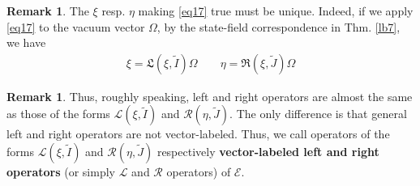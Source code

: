 \documentclass[11pt,b5paper,notitlepage]{article}
\theoremstyle{definition}
\newtheorem{rem}[df]{Remark}
\theoremstyle{plain}
\newtheorem{pp}[df]{Proposition}
\newcommand{\fk}{\mathfrak}
\newcommand{\mc}{\mathcal}
\newcommand{\wtd}{\widetilde}
\newcommand{\scr}{\mathscr}
\newcommand{\xk}{\mathfrak x}
\newcommand{\yk}{\mathfrak y}
\newcommand{\pr}{\mathrm {pr}}
\numberwithin{equation}{section}
\begin{document}
\begin{comment}
\begin{pp}\label{lb11}
In Def. \ref{lb2}, let $\xi=\fk L(\xk,\wtd I)\Omega$ and $\eta=\fk R(\yk,\wtd J)\Omega$. Then $\xi\in\mc H_i^\pr(I)$ and $\eta\in\mc H_j^\pr(J)$, and we have
\begin{align}\label{eq7}
\fk L(\xk,\wtd I)=\scr L(\xi,\wtd I)\qquad \fk R(\yk,\wtd I)=\scr R(\eta,\wtd J)
\end{align}
when acting any object of $\scr C$.
\end{pp}



\begin{proof}
By assumption, $\fk L(\xk,\wtd I)|_{\mc H_0}$ is closed and has core $\mc H_k(\wtd I')$, and for each $y\in\mc A(I')$ we have by \eqref{eq3} that
\begin{align*}
y\xi=R(y\Omega,\wtd I')\fk L(\xk,\wtd I)\Omega=\fk L(\xk,\wtd I)y\Omega
\end{align*}
This proves $\xi\in\mc H_i^\pr(I)$. By \eqref{eq4} and \eqref{eq5}, we see that $\fk L(\xk,\wtd I)|_{\mc H_k}$ equals $\scr L(\xi,\wtd I)|_{\mc H_k}$ when acting on their common core $\mc H_k(I')$. This proves the first half of the proposition \eqref{eq7}. The second half can be proved in a similar way.
\end{proof}
\end{comment}


\begin{rem}
The $\xi$ resp. $\eta$ making \eqref{eq17} true must be unique. Indeed, if we apply \eqref{eq17} to the vacuum vector $\Omega$, by the state-field correspondence in Thm. \ref{lb7}, we have 
\begin{align}
\xi=\fk L(\xi,\wtd I)\Omega\qquad \eta=\fk R(\xi,\wtd J)\Omega
\end{align}
\end{rem}


\begin{rem}\label{lb23}
Thus, roughly speaking, left and right operators are almost the same as those of the forms $\scr L(\xi,\wtd I)$ and $\scr R(\eta,\wtd J)$. The only difference is that general left and right operators are not vector-labeled. Thus, we call operators of the forms $\scr L(\xi,\wtd I)$ and $\scr R(\eta,\wtd J)$ respectively \textbf{vector-labeled left and right operators} (or simply $\scr L$ and $\scr R$ operators) of $\scr E$.
\end{rem}
\end{document}
